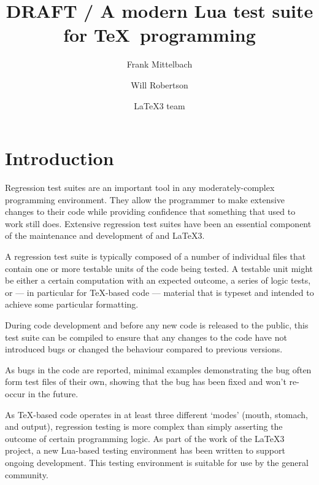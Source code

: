 \documentclass[a4paper]{ltugboat}
\begin{document}
\title{DRAFT / A modern Lua test suite for \TeX\ programming}
\author{Frank Mittelbach \and Will Robertson \and \LaTeX3 team}

\newcommand\drivername{build.lua}
\newcommand\makename{l3build.lua}
\newcommand\execname{texlua \drivername}
\newcommand\compdirname{test/}

\setcounter{page}{777}

\maketitle

\tableofcontents

\section{Introduction}

Regression test suites are an important tool in any moderately-complex programming environment.
They allow the programmer to make extensive changes to their code while providing confidence that something that used to work still does.
Extensive regression test suites have been an essential component of the maintenance and development of \LaTeXe{} and \LaTeX3.

A regression test suite is typically composed of a number of individual files that contain one or more testable units of the code being tested. A testable unit might be either a certain computation with an expected outcome, a series of logic tests, or --- in particular for \TeX{}-based code --- material that is typeset and intended to achieve some particular formatting.

During code development and before any new code is released to the public, this test suite can be compiled to ensure that any changes to the code have not introduced bugs or changed the behaviour compared to previous versions.

As bugs in the code are reported, minimal examples demonstrating the bug often form test files of their own, showing that the bug has been fixed and won't re-occur in the future.

As \TeX{}-based code operates in at least three different `modes' (mouth, stomach, and output), regression testing is more complex than simply asserting the outcome of certain programming logic.
As part of the work of the \LaTeX3 project, a new Lua-based testing environment has been written to support ongoing development.
This testing environment is suitable for use by the general community.
\end{document}
